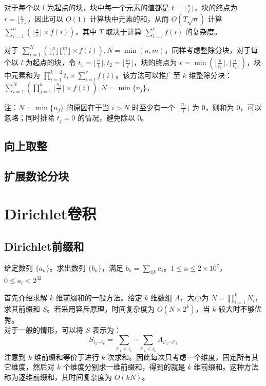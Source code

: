 \documentclass[12pt,a4paper]{article}
\begin{document}
对于每个以 $l$ 为起点的块，块中每一个元素的值都是 $\displaystyle t=\lfloor\frac{n}{l}\rfloor$，块的终点为 $\displaystyle r=\lfloor\frac{n}{t}\rfloor$，因此可以 $O(1)$ 计算块中元素的和，从而 $O(T\sqrt{n})$ 计算 $\displaystyle\sum_{i=1}^{n}(\lfloor\frac{n}{i}\rfloor\times f(i))$，其中 $T$ 取决于计算 $\displaystyle \sum_{i=l}^{r}f(i)$ 的复杂度。

对于 $\displaystyle \sum_{i=1}^{N}(\lfloor\frac{n}{i}\rfloor\lfloor\frac{m}{i}\rfloor\times f(i)),N=\min(n,m)$，同样考虑整除分块，对于每个以 $l$ 为起点的块，令 $\displaystyle t_1=\lfloor\frac{n}{l}\rfloor,t_2=\lfloor\frac{m}{l}\rfloor$，块的终点为 $\displaystyle r=\min(\lfloor\frac{n}{t_1}\rfloor,\lfloor\frac{n}{t_2}\rfloor)$，块中元素和为 $\displaystyle \prod_{i=1}^{k=2}t_i\times \sum_{i=l}^{r}f(i)$。该方法可以推广至 $k$ 维整除分块：$\displaystyle \sum_{i=1}^{N}(\prod_{j=1}^{k}\lfloor\frac{n_j}{i}\rfloor\times f(i)),N=\min\{n_j\}$。

注：$N=\min\{n_j\}$ 的原因在于当 $i>N$ 时至少有一个 $\displaystyle\lfloor\frac{n_j}{i}\rfloor$ 为 $0$，则和为 $0$，可以忽略；同时排除 $t_j=0$ 的情况，避免除以 $0$。
\subsection{向上取整}
\subsection{扩展数论分块}
\newpage
\section{Dirichlet卷积}
\subsection{Dirichlet前缀和}
\begin{mdframed}[leftline=true, linewidth=2pt, linecolor=gray]
	给定数列 $\{a_n\}$。求出数列 $\{b_n\}$，满足 $\displaystyle b_k=\sum_{i|k}a_i$。$1\leq n\leq 2\times 10^7$，$0\leq a_i< 2^{32}$
\end{mdframed}

首先介绍求解 $k$ 维前缀和的一般方法。给定 $k$ 维数组 $A$，大小为 $\displaystyle N=\prod_{i=1}^{k}{N_i}$，求其前缀和 $S$。若采用容斥原理，时间复杂度为 $O(N\times2^k)$，当 $k$ 较大时不够优秀。\\

对于一般的情形，可以将 $S$ 表示为：
\begin{equation*}
	\displaystyle S_{i_1\cdots i_k}=\sum_{i'_1\le i_1}\cdots\sum_{i'_k\le i_k}A_{i'_1\cdots i'_k}
\end{equation*}
注意到 $k$ 维前缀和等价于进行 $k$ 次求和。因此每次只考虑一个维度，固定所有其它维度，然后对 $k$ 个维度分别求一维前缀和，得到的就是 $k$ 维前缀和。这种方法称为逐维前缀和，其时间复杂度为 $O(kN)$。
\end{document}
